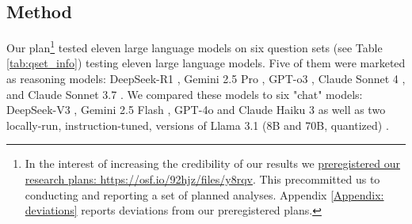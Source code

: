 \documentclass{article}
\begin{document}
\begin{table}[tp]
\centering
\scriptsize
{}
\caption{The six question sets in Study 1.}

\label{tab:qset_info}
\end{table}

\subsection{Method}
Our plan\footnote{In the interest of increasing the credibility of our results we \href{https://osf.io/92hjz/files/y8rqv}{preregistered our research plans: https://osf.io/92hjz/files/y8rqv}. This precommitted us to conducting and reporting a set of planned analyses. Appendix \ref{Appendix: deviations} reports deviations from our preregistered plans.} tested eleven large language models on six question sets (see Table \ref{tab:qset_info}) testing eleven large language models. Five of them were marketed as reasoning models: DeepSeek-R1 \citep{dsr1}, Gemini 2.5 Pro \citep{gem_pro}, GPT-o3 \citep{gpt_o3}, Claude Sonnet 4 \citep{claude_sonnet_4}, and Claude Sonnet 3.7 \citep{claude_sonnet_37}. We compared these models to six "chat" models: DeepSeek-V3 \citep{dsv3}, Gemini 2.5 Flash \citep{gem_flash}, GPT-4o \citep{gpt4} and Claude Haiku 3 \citep{claude_haiku} as well as two locally-run, instruction-tuned, versions of Llama 3.1 (8B and 70B, quantized) \citep{llama_70, llama_8}. 
\end{document}
